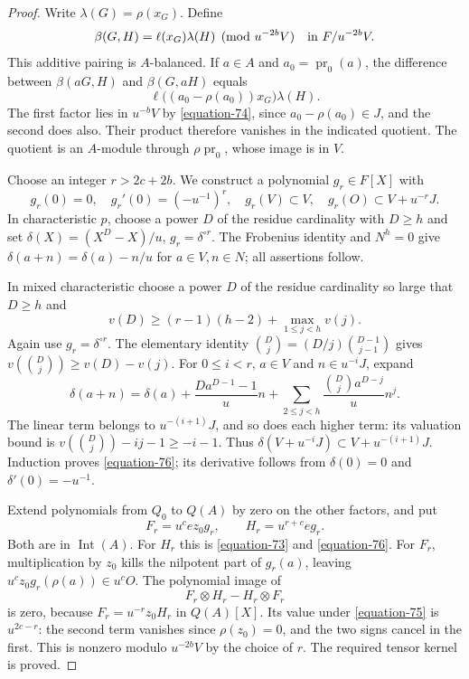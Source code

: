 \documentclass[11pt,a4paper]{article}
\theoremstyle{definition}
\begin{document}
\begin{proof}
Write $\lambda(G)=\rho(x_G)$. Define
\begin{equation}
 \beta(G,H)=\ell(x_G)\lambda(H)\pmod {u^{-2b}V}
                         \quad\hbox{in }F/u^{-2b}V.
                                                               \label{equation-75}
\end{equation}
This additive pairing is $A$-balanced. If $a\in A$ and
$a_0=\operatorname{pr}_0(a)$, the difference between
$\beta(aG,H)$ and $\beta(G,aH)$ equals
\[
 \ell\bigl((a_0-\rho(a_0))x_G\bigr)\lambda(H).
\]
The first factor lies in $u^{-b}V$ by \eqref{equation-74}, since
$a_0-\rho(a_0)\in J$, and the second does also.
Their product therefore vanishes in the indicated quotient.
The quotient is an $A$-module through $\rho\operatorname{pr}_0$,
whose image is in $V$.

Choose an integer $r>2c+2b$. We construct a polynomial
$g_r\in F[X]$ with
\begin{equation}
 g_r(0)=0,\quad g_r'(0)=(-u^{-1})^r,\quad
 g_r(V)\subset V,\quad g_r(O)\subset V+u^{-r}J.             \label{equation-76}
\end{equation}
In characteristic $p$, choose a power $D$ of the residue
cardinality with $D\ge h$ and set
$\delta(X)=(X^D-X)/u$, $g_r=\delta^{\circ r}$.
The Frobenius identity and $N^h=0$ give
$\delta(a+n)=\delta(a)-n/u$ for $a\in V,n\in N$;
all assertions follow.

In mixed characteristic choose a power $D$ of the residue
cardinality so large that $D\ge h$ and
\[
 v(D)\ge (r-1)(h-2)+\max_{1\le j<h}v(j).
\]
Again use $g_r=\delta^{\circ r}$. The elementary identity
$\binom Dj=(D/j)\binom{D-1}{j-1}$ gives
$v(\binom Dj)\ge v(D)-v(j)$.
For $0\le i<r$, $a\in V$ and $n\in u^{-i}J$, expand
\[
 \delta(a+n)=\delta(a)+\frac{Da^{D-1}-1}{u}n
          +\sum_{2\le j<h}\frac{\binom Dj a^{D-j}}u n^j.
\]
The linear term belongs to $u^{-(i+1)}J$, and so does
each higher term: its valuation bound is
$v(\binom Dj)-ij-1\ge-i-1$.
Thus $\delta(V+u^{-i}J)\subset V+u^{-(i+1)}J$.
Induction proves \eqref{equation-76}; its derivative follows from
$\delta(0)=0$ and $\delta'(0)=-u^{-1}$.

Extend polynomials from $Q_0$ to $Q(A)$ by zero on the
other factors, and put
\[
       F_r=u^c e z_0g_r,\qquad H_r=u^{r+c}eg_r.
\]
Both are in $\operatorname{Int}(A)$. For $H_r$ this is
\eqref{equation-73} and \eqref{equation-76}. For $F_r$, multiplication by $z_0$
kills the nilpotent part of $g_r(a)$, leaving
$u^cz_0g_r(\rho(a))\in u^cO$.
The polynomial image of
\[
                   F_r\otimes H_r-H_r\otimes F_r
\]
is zero, because $F_r=u^{-r}z_0H_r$ in $Q(A)[X]$.
Its value under \eqref{equation-75} is $u^{2c-r}$: the second term
vanishes since $\rho(z_0)=0$, and the two signs cancel
in the first. This is nonzero modulo $u^{-2b}V$ by the
choice of $r$. The required tensor kernel is proved.


\end{proof}
\end{document}
